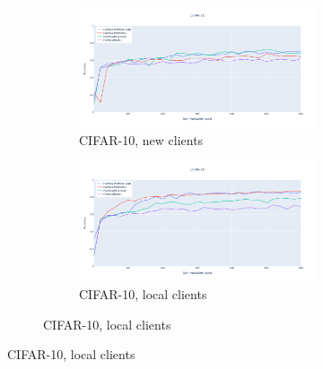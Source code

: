 \begin{figure}
    \centering
    \begin{subfigure}{\textwidth}
        \centering
        \begin{subfigure}{.5\textwidth}
            \centering
            \includegraphics[width=\linewidth]{./tab_img/cifar_meta_new.png}
            \caption{CIFAR-10, new clients}
            \label{fig:cifar_fedmetaper_new}
        \end{subfigure}%
        \begin{subfigure}{.5\textwidth}
            \centering
            \includegraphics[width=\linewidth]{./tab_img/cifar_meta_old.png}
            \caption{CIFAR-10, local clients}
            \label{fig:cifar_fedmetaper_old}
        \end{subfigure}
    \end{subfigure}


\end{figure}
